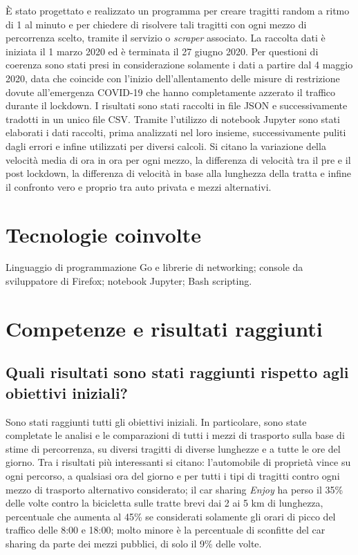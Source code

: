 \documentclass[a4paper,12pt]{article}
\begin{document}
\`E stato progettato e realizzato un programma per creare tragitti random a ritmo di 1 al minuto e per chiedere di risolvere tali tragitti con ogni mezzo di percorrenza scelto, tramite il servizio o \textit{scraper} associato. La raccolta dati è iniziata il 1 marzo 2020 ed è terminata il 27 giugno 2020. Per questioni di coerenza sono stati presi in considerazione solamente i dati a partire dal 4 maggio 2020, data che coincide con l'inizio dell'allentamento delle misure di restrizione dovute all'emergenza COVID-19 che hanno completamente azzerato il traffico durante il lockdown. I risultati sono stati raccolti in file JSON e successivamente tradotti in un unico file CSV. Tramite l'utilizzo di notebook Jupyter sono stati elaborati i dati raccolti, prima analizzati nel loro insieme, successivamente puliti dagli errori e infine utilizzati per diversi calcoli. Si citano la variazione della velocità media di ora in ora per ogni mezzo, la differenza di velocità tra il pre e il post lockdown, la differenza di velocità in base alla lunghezza della tratta e infine il confronto vero e proprio tra auto privata e mezzi alternativi.

\section{Tecnologie coinvolte}
Linguaggio di programmazione Go e librerie di networking; console da sviluppatore di Firefox; notebook Jupyter; Bash scripting.

\section{Competenze e risultati raggiunti}

\subsection{Quali risultati sono stati raggiunti rispetto agli obiettivi iniziali?}
Sono stati raggiunti tutti gli obiettivi iniziali. In particolare, sono state completate le analisi e le comparazioni di tutti i mezzi di trasporto sulla base di stime di percorrenza, su diversi tragitti di diverse lunghezze e a tutte le ore del giorno. Tra i risultati più interessanti si citano: l'automobile di proprietà vince su ogni percorso, a qualsiasi ora del giorno e per tutti i tipi di tragitti contro ogni mezzo di trasporto alternativo considerato; il car sharing \textit{Enjoy} ha perso il 35\% delle volte contro la bicicletta sulle tratte brevi dai 2 ai 5 km di lunghezza, percentuale che aumenta al 45\% se considerati solamente gli orari di picco del traffico delle 8:00 e 18:00; molto minore è la percentuale di sconfitte del car sharing da parte dei mezzi pubblici, di solo il 9\% delle volte.
\end{document}
